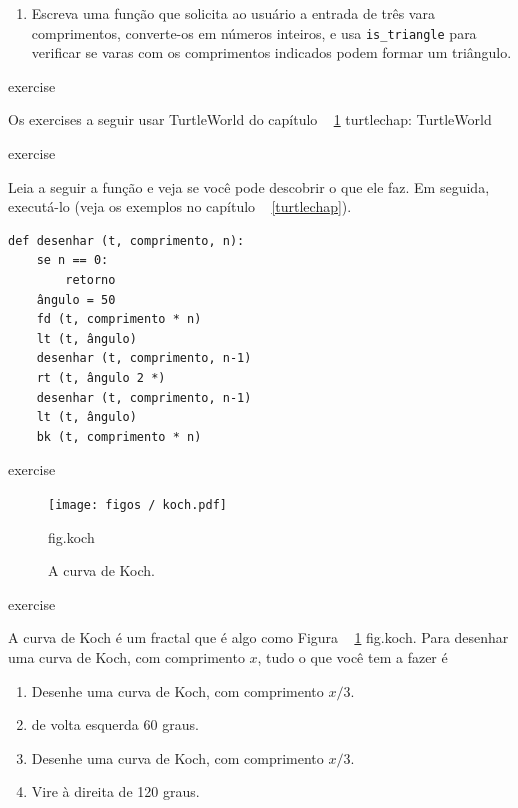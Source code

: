 \documentclass[10pt]{book}
\begin{document}
\begin{exercise}
{{\begin{}
\begin{enumerate}
\item Escreva uma função que solicita ao usuário a entrada de três vara
  comprimentos, converte-os em números inteiros, e usa \verb "is_triangle" para
  verificar se varas com os comprimentos indicados podem formar um triângulo.

\end{enumerate}

\end{} exercise

Os exercises a seguir usar TurtleWorld do capítulo ~ \ref {} turtlechap:
\index{} TurtleWorld

\begin{} exercise

Leia a seguir a função e veja se você pode descobrir
o que ele faz. Em seguida, executá-lo (veja os exemplos no capítulo ~ \ref {turtlechap}).

\begin{verbatim}
def desenhar (t, comprimento, n):
    se n == 0:
        retorno
    ângulo = 50
    fd (t, comprimento * n)
    lt (t, ângulo)
    desenhar (t, comprimento, n-1)
    rt (t, ângulo 2 *)
    desenhar (t, comprimento, n-1)
    lt (t, ângulo)
    bk (t, comprimento * n)
\end{verbatim}

\end{} exercise


\begin{figure}
\centerline
{\texttt{[image: figos / koch.pdf]}}
\caption{A curva de Koch.}
\label{} fig.koch
\end{figure}

\begin{} exercise

A curva de Koch é um fractal que é algo como
Figura ~ \ref {} fig.koch. Para desenhar uma curva de Koch, com comprimento $ x $, tudo o que você
tem a fazer é

\begin{enumerate}

\item Desenhe uma curva de Koch, com comprimento $ x / 3 $.

\item de volta esquerda 60 graus.

\item Desenhe uma curva de Koch, com comprimento $ x / 3 $.

\item Vire à direita de 120 graus.


\end{enumerate}
\end{}}}
\end{exercise}
\end{document}
